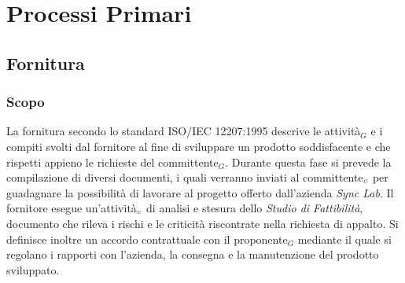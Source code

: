 \chapter{Processi Primari}\label{ProcessiPrimari}
\section{Fornitura}\label{ProcessiPrimariFornitura}
\subsection{Scopo}\label{ProcessiPrimariFornituraScopo}
La fornitura secondo lo standard ISO/IEC 12207:1995 descrive le attività$_G$ e i compiti svolti dal fornitore al fine di sviluppare un prodotto soddisfacente e che rispetti appieno le richieste del committente$_G$.
Durante questa fase si prevede la compilazione di diversi documenti, i quali verranno inviati al committente$_{\scaleto{G}{3pt}}$ per guadagnare la possibilità di lavorare al progetto offerto dall'azienda \textit{Sync Lab}.
Il fornitore esegue un'attività$_{\scaleto{G}{3pt}}$ di analisi e stesura dello \textit{Studio di Fattibilità}, documento che rileva i rischi e le criticità riscontrate nella richiesta di appalto.
Si definisce inoltre un accordo contrattuale con il proponente$_G$ mediante il quale si regolano i rapporti con l'azienda, la consegna e la manutenzione del prodotto sviluppato.

